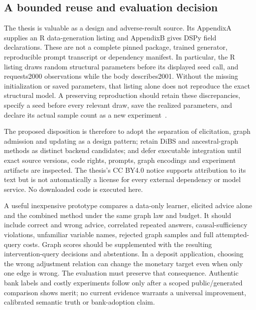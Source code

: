 \subsection{A bounded reuse and evaluation decision}
The thesis is valuable as a design and adverse-result source. Its AppendixA supplies an R data-generation listing and AppendixB gives DSPy field declarations. These are not a complete pinned package, trained generator, reproducible prompt transcript or dependency manifest. In particular, the R listing draws random structural parameters before its displayed seed call, and requests2000 observations while the body describes2001. Without the missing initialization or saved parameters, that listing alone does not reproduce the exact structural model. A preserving reproduction should retain these discrepancies, specify a seed before every relevant draw, save the realized parameters, and declare its actual sample count as a new experiment~\citep{exec18_videira_thesis}.

The proposed disposition is therefore to adopt the separation of elicitation, graph admission and updating as a design pattern; retain DiBS and ancestral-graph methods as distinct backend candidates; and defer executable integration until exact source versions, code rights, prompts, graph encodings and experiment artifacts are inspected. The thesis's CC BY4.0 notice supports attribution to its text but is not automatically a license for every external dependency or model service. No downloaded code is executed here.

A useful inexpensive prototype compares a data-only learner, elicited advice alone and the combined method under the same graph law and budget. It should include correct and wrong advice, correlated repeated answers, causal-sufficiency violations, unfamiliar variable names, rejected graph samples and full attempted-query costs. Graph scores should be supplemented with the resulting intervention-query decisions and abstentions. In a deposit application, choosing the wrong adjustment relation can change the monetary target even when only one edge is wrong. The evaluation must preserve that consequence. Authentic bank labels and costly experiments follow only after a scoped public/generated comparison shows merit; no current evidence warrants a universal improvement, calibrated semantic truth or bank-adoption claim.
\label{exec18:bayesian-advice-end}
